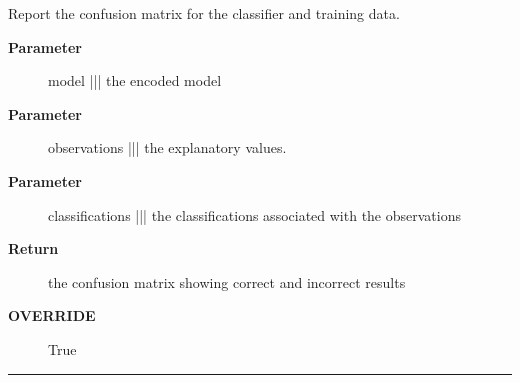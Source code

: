 \par
Report the confusion matrix for the classifier and training data.

\par
\begin{description}
\item [\textbf{Parameter}] model ||| the encoded model
\item [\textbf{Parameter}] observations ||| the explanatory values.
\item [\textbf{Parameter}] classifications ||| the classifications associated with the observations
\item [\textbf{Return}] the confusion matrix showing correct and incorrect results
\item [\textbf{OVERRIDE}] True
\end{description}

\rule{\textwidth}{0.4pt}


